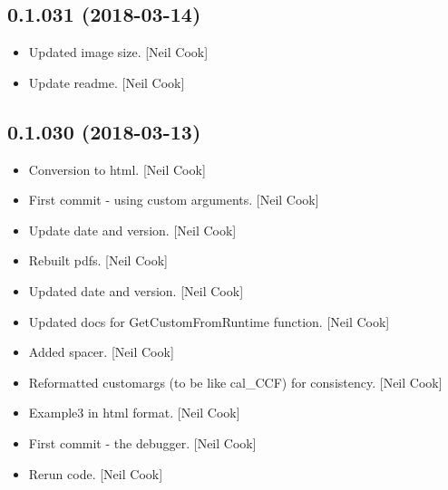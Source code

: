 \documentclass[a4paper,10pt,english]{report}
\begin{document}
\subsection{0.1.031 (2018-03-14)}
\label{\detokenize{misc/changelog:id471}}\begin{itemize}
\item {} 
Updated image size. {[}Neil Cook{]}

\item {} 
Update readme. {[}Neil Cook{]}

\end{itemize}


\subsection{0.1.030 (2018-03-13)}
\label{\detokenize{misc/changelog:id472}}\begin{itemize}
\item {} 
Conversion to html. {[}Neil Cook{]}

\item {} 
First commit - using custom arguments. {[}Neil Cook{]}

\item {} 
Update date and version. {[}Neil Cook{]}

\item {} 
Rebuilt pdfs. {[}Neil Cook{]}

\item {} 
Updated date and version. {[}Neil Cook{]}

\item {} 
Updated docs for GetCustomFromRuntime function. {[}Neil Cook{]}

\item {} 
Added spacer. {[}Neil Cook{]}

\item {} 
Reformatted customargs (to be like cal\_CCF) for consistency. {[}Neil
Cook{]}

\item {} 
Example3 in html format. {[}Neil Cook{]}

\item {} 
First commit - the debugger. {[}Neil Cook{]}

\item {} 
Rerun code. {[}Neil Cook{]}

\end{itemize}
\end{document}
